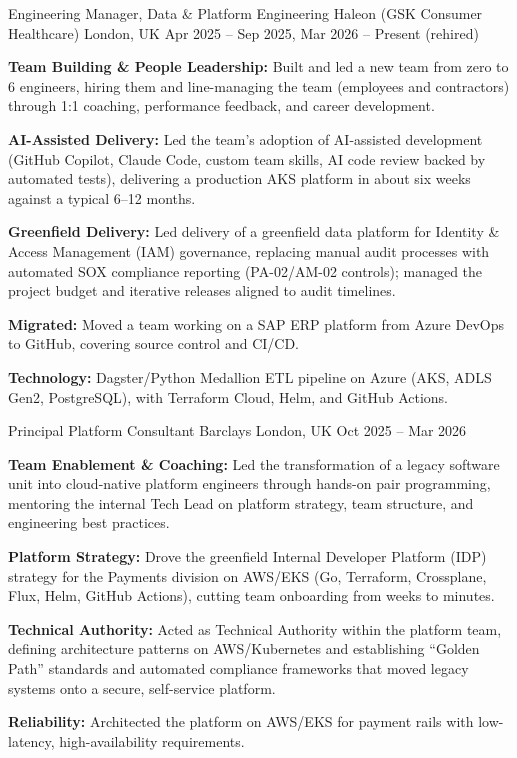 \begin{cventries}

  \cvjobw
  {Engineering Manager, Data \& Platform Engineering}
  {Haleon (GSK Consumer Healthcare)}
  {London, UK}
  {Apr 2025 -- Sep 2025, Mar 2026 -- Present (rehired)}
  {
    \begin{cvitems}
      \item {\textbf{Team Building \& People Leadership:} Built and led a new team from zero to 6
                engineers, hiring them and line-managing the team (employees and contractors) through 1:1 coaching, performance
                feedback, and career development.}
      \item {\textbf{AI-Assisted Delivery:} Led the team's adoption of AI-assisted development (GitHub Copilot, Claude Code, custom
                team skills, AI code review backed by automated tests), delivering a production AKS platform in about six weeks
                against a typical 6--12 months.}
      \item {\textbf{Greenfield Delivery:} Led delivery of a greenfield data platform for Identity \& Access Management (IAM) governance,
                replacing manual audit processes with automated SOX compliance reporting (PA-02/AM-02 controls); managed the
                project budget and iterative releases aligned to audit timelines.}
      \item {\textbf{Migrated:} Moved a team working on a SAP ERP platform from Azure DevOps to GitHub, covering source control
                and CI/CD.}
      \item {\textbf{Technology:} Dagster/Python Medallion ETL pipeline on Azure (AKS, ADLS Gen2, PostgreSQL), with Terraform Cloud, Helm, and GitHub Actions.}
    \end{cvitems}
  }

  \cvjob
  {Principal Platform Consultant}
  {Barclays}
  {London, UK}
  {Oct 2025 -- Mar 2026}
  {
    \begin{cvitems}
      \item {\textbf{Team Enablement \& Coaching:} Led the transformation of a legacy software unit into cloud-native platform
                engineers through hands-on pair programming, mentoring the internal Tech Lead on platform strategy, team structure,
                and engineering best practices.}
      \item {\textbf{Platform Strategy:} Drove the greenfield Internal Developer Platform (IDP) strategy for the Payments division
                on AWS/EKS (Go, Terraform, Crossplane, Flux, Helm, GitHub Actions), cutting team onboarding from weeks to minutes.}
      \item {\textbf{Technical Authority:} Acted as Technical Authority within the platform team, defining architecture patterns on
                AWS/Kubernetes and establishing ``Golden Path'' standards and automated compliance frameworks that moved legacy
                systems onto a secure, self-service platform.}
      \item {\textbf{Reliability:} Architected the platform on AWS/EKS for payment rails with low-latency, high-availability requirements.}
    \end{cvitems}
  }


\end{cventries}
